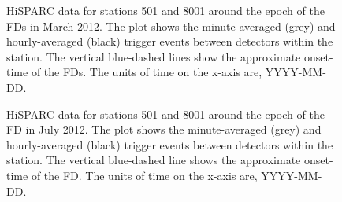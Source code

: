 \begin{figure}[ht!]
	\centering
	
	\caption{HiSPARC data for stations 501 and 8001 around the epoch of the FDs in March 2012. The plot shows the minute-averaged (grey) and hourly-averaged (black) trigger events between detectors within the station. The vertical blue-dashed lines show the approximate onset-time of the FDs. The units of time on the x-axis are, YYYY-MM-DD.}
	\label{fig:FD_201203}
\end{figure}

\begin{figure}[ht!]
	\centering
	
	\caption{HiSPARC data for stations 501 and 8001 around the epoch of the FD in July 2012. The plot shows the minute-averaged (grey) and hourly-averaged (black) trigger events between detectors within the station. The vertical blue-dashed line shows the approximate onset-time of the FD. The units of time on the x-axis are, YYYY-MM-DD.}
	\label{fig:FD_201207}
\end{figure}

